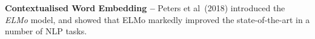 \documentclass[12pt,a4paper]{article}
\begin{document}

\noindent \textbf{Contextualised Word Embedding --} Peters et al\ (2018) \cite{peters2018deep} introduced the \textit{ELMo} model, and showed that ELMo markedly improved the state-of-the-art in a number of NLP tasks.\\\vspace{-10pt}
\end{document}
